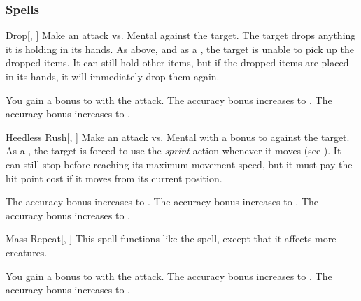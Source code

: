 \subsubsection{Spells}


\lowercase{\hypertarget{spell:Drop}{}}\label{spell:Drop}
\begin{freeability}[Rank 1]{\hypertarget{spell:Drop}{Drop}}[, ]
Make an attack vs. Mental against the target.
\hit The target drops anything it is holding in its hands.
\crit As above, and as a , the target is unable to pick up the dropped items.
It can still hold other items, but if the dropped items are placed in its hands, it will immediately drop them again.

\rankline
{} You gain a  bonus to  with the attack.
 The accuracy bonus increases to .
 The accuracy bonus increases to .
\end{freeability}
\vspace{0.25em}



\lowercase{\hypertarget{spell:Heedless Rush}{}}\label{spell:Heedless Rush}
\begin{freeability}[Rank 1]{\hypertarget{spell:Heedless Rush}{Heedless Rush}}[, ]
Make an attack vs. Mental with a  bonus to  against the target.
\hit As a , the target is forced to use the \textit{sprint} action whenever it moves (see ).
It can still stop before reaching its maximum movement speed, but it must pay the hit point cost if it moves from its current position.

\rankline
{} The accuracy bonus increases to .
 The accuracy bonus increases to .
 The accuracy bonus increases to .
\end{freeability}
\vspace{0.25em}



\lowercase{\hypertarget{spell:Mass Repeat}{}}\label{spell:Mass Repeat}
\begin{freeability}[Rank 1]{\hypertarget{spell:Mass Repeat}{Mass Repeat}}[, ]
This spell functions like the  spell, except that it affects more creatures.

\rankline
{} You gain a  bonus to  with the attack.
 The accuracy bonus increases to .
 The accuracy bonus increases to .
\end{freeability}
\vspace{0.25em}



